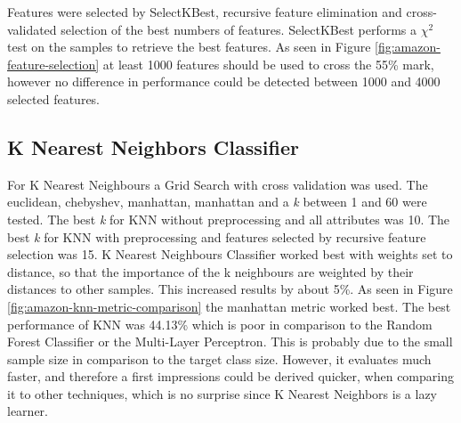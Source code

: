 Features were selected by SelectKBest, recursive feature elimination and cross-validated selection of the best numbers of features.
SelectKBest performs a ${\chi}^2$ test on the samples to retrieve the best features.
As seen in Figure \ref{fig:amazon-feature-selection} at least 1000 features should be used to cross the 55\% mark, however no difference in performance could be detected between 1000 and 4000 selected features.



\subsection{K Nearest Neighbors Classifier}

For K Nearest Neighbours a Grid Search with cross validation was used. The euclidean, chebyshev, manhattan, manhattan and a \textit{k} between 1 and 60 were tested. 
The best \textit{k} for KNN without preprocessing and all attributes was 10.
The best \textit{k} for KNN with preprocessing and features selected by recursive feature selection was 15.
K Nearest Neighbours Classifier worked best with weights set to distance, so that the importance of the k neighbours are weighted by their distances to other samples.
This increased results by about 5\%. As seen in Figure \ref{fig:amazon-knn-metric-comparison} the manhattan metric worked best.
The best performance of KNN was 44.13\% which is poor in comparison to the Random Forest Classifier or the Multi-Layer Perceptron.
This is probably due to the small sample size in comparison to the target class size.
However, it evaluates much faster, and therefore a first impressions could be derived quicker, when comparing it to other techniques, which is no surprise since K Nearest Neighbors is a lazy learner.


